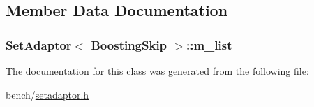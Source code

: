 \subsection{Member Data Documentation}
\hypertarget{classSetAdaptor_3_01BoostingSkip_01_4_a87d9e950d7d00b9994a39715a1ae6941}{
\subsubsection[{m\-\_\-list}]{ {\bf Set\-Adaptor}$<$ {\bf Boosting\-Skip} $>$\-::m\-\_\-list\hspace{0.3cm}{\ttfamily [private]}}}\label{classSetAdaptor_3_01BoostingSkip_01_4_a87d9e950d7d00b9994a39715a1ae6941}


The documentation for this class was generated from the following file\-:\begin{DoxyCompactItemize}
\item 
bench/\hyperlink{setadaptor_8h}{setadaptor.\-h}\end{DoxyCompactItemize}
